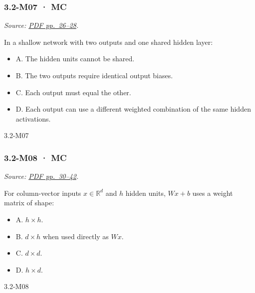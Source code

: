 \noindent\begin{minipage}{\linewidth}

\subsubsection{3.2-M07 · MC}\label{m07-mc-8}

\emph{Source:
\href{../Lecture\%20Slides/3.2.\%20Shallow\%20NN.pdf\#page=26}{PDF
pp.~26--28}.}

In a shallow network with two outputs and one shared hidden layer:

\begin{itemize}
\tightlist
\item
  A. The hidden units cannot be shared.
\item
  B. The two outputs require identical output biases.
\item
  C. Each output must equal the other.
\item
  D. Each output can use a different weighted combination of the same
  hidden activations.
\end{itemize}

\begin{solution}[8mm]{3.2-M07}

\end{solution}
\end{minipage}\par\medskip

\noindent\begin{minipage}{\linewidth}

\subsubsection{3.2-M08 · MC}\label{m08-mc-8}

\emph{Source:
\href{../Lecture\%20Slides/3.2.\%20Shallow\%20NN.pdf\#page=30}{PDF
pp.~30--42}.}

For column-vector inputs \(x\in\mathbb{R}^{d}\) and \(h\) hidden units,
\(Wx+b\) uses a weight matrix of shape:

\begin{itemize}
\tightlist
\item
  A. \(h\times h\).
\item
  B. \(d\times h\) when used directly as \(Wx\).
\item
  C. \(d\times d\).
\item
  D. \(h\times d\).
\end{itemize}

\begin{solution}[8mm]{3.2-M08}

\end{solution}
\end{minipage}\par\medskip

